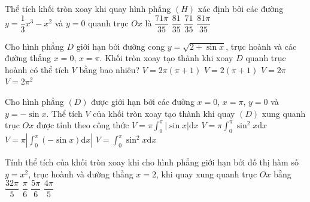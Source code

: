 \begin{ex}%
	Thể tích khối  tròn xoay khi quay hình phẳng $(H)$ xác định bởi các đường $y=\dfrac{1}{3} x^3-x^2$ và $y=0$ quanh trục $Ox$ là
	\choice 
		{$\dfrac{71\pi}{35}$} 
		{$\dfrac{81}{35}$} 
		{$\dfrac{71}{35}$} 
		 {\True $\dfrac{81\pi}{35}$}
\end{ex}

\begin{ex}%
	Cho hình phẳng $D$ giới hạn bởi đường cong  $y=\sqrt{2+\sin x}$, trục hoành và các đường thẳng $x=0$, $x=\pi$. Khối tròn xoay tạo thành khi xoay $D$ quanh trục hoành có thể tích $V$ bằng bao nhiêu?
	 \choice
		{\True $V=2\pi(\pi+1)$} 
		 {$V=2(\pi+1)$}
		{$V=2\pi$} 
		{$V=2\pi^2$} 
\end{ex}

\begin{ex}%
	Cho  hình phẳng $(D)$ được giới hạn bởi các đường $x=0$, $x=\pi$, $y=0$ và $y=-\sin x$. Thể tích $V$ của khối tròn xoay tạo thành khi quay $(D)$ xung quanh trục $Ox$ được tính theo công thức
	 \choice
		 {$V=\pi \displaystyle\int_0^{\pi}\left|\sin x\right|\mathrm{d}x$}
		{\True $V=\pi \displaystyle\int_0^{\pi}\sin  ^2x\mathrm{d}x$}
		{$V=\pi \left|\displaystyle\int_0^{\pi}(-\sin x)\mathrm{d}x  \right|$}
		 {$V=\displaystyle\int_0^{\pi}\sin ^2x\mathrm{d}x$}
\end{ex}

\begin{ex}%
	Tính thể tích của  khối tròn xoay khi cho hình phẳng giới hạn bởi đồ thị hàm số $y=x^2$, trục hoành và đường thẳng $x=2$, khi quay xung quanh trục $Ox$ bằng
	\choice 
		 {\True $\dfrac{32\pi}{5}$}
		 {$\dfrac{\pi}{6}$}
		{$\dfrac{5\pi}{6}$} 
		 {$\dfrac{4\pi}{5}$}
\end{ex}

